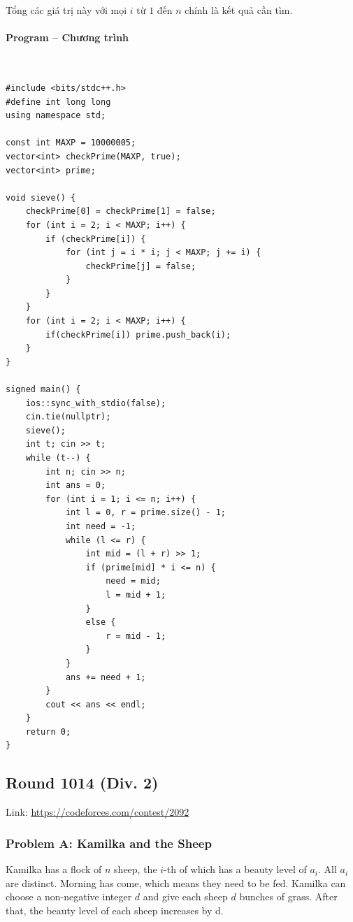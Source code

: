 \documentclass{article}
\begin{document}
Tổng các giá trị này với mọi $i$ từ $1$ đến $n$ chính là kết quả cần tìm.

\paragraph{Program -- Chương trình} \mbox{} \\

\begin{lstlisting} 
#include <bits/stdc++.h>
#define int long long
using namespace std;

const int MAXP = 10000005;
vector<int> checkPrime(MAXP, true);
vector<int> prime;

void sieve() {
	checkPrime[0] = checkPrime[1] = false;
	for (int i = 2; i < MAXP; i++) {
		if (checkPrime[i]) {
			for (int j = i * i; j < MAXP; j += i) {
				checkPrime[j] = false;
			}
		}
	}
	for (int i = 2; i < MAXP; i++) {
		if(checkPrime[i]) prime.push_back(i);
	}
}

signed main() {
	ios::sync_with_stdio(false);
	cin.tie(nullptr);
	sieve();
	int t; cin >> t;
	while (t--) {
		int n; cin >> n;
		int ans = 0;
		for (int i = 1; i <= n; i++) {
			int l = 0, r = prime.size() - 1;
			int need = -1;
			while (l <= r) {
				int mid = (l + r) >> 1;
				if (prime[mid] * i <= n) {
					need = mid;
					l = mid + 1;
				}
				else {
					r = mid - 1;
				}
			}
			ans += need + 1;
		}
		cout << ans << endl;
	}
	return 0;
}
\end{lstlisting}


\subsection{Round 1014 (Div. 2)}

Link: \url{https://codeforces.com/contest/2092}

\subsubsection{Problem A: Kamilka and the Sheep}

Kamilka has a flock of $n$ sheep, the $i$-th of which has a beauty level of $a_i$. All $a_i$ are distinct. Morning has come, which means they need to be fed. Kamilka can choose a non-negative integer $d$ and give each sheep $d$ bunches of grass. After that, the beauty level of each sheep increases by d. \\
\end{document}
